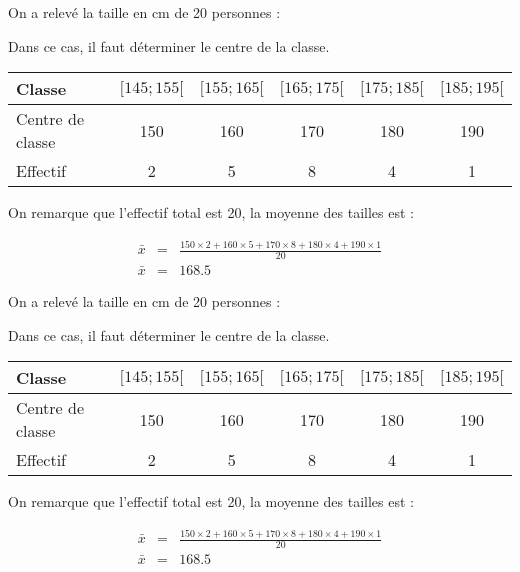 \documentclass[12pt,a4paper]{article}
\date{}
\title{}
\begin{document}

%
%
%
%
%
%
%
%
%



\begin{myex}
	On a relevé la taille en cm de 20 personnes :
	
	Dans ce cas, il faut déterminer le centre de la classe.
	
	\begin{tabular}{|@{\ }l@{\ }|@{\ }c@{\ }|@{\ }c@{\ }|@{\ }c@{\ }|@{\ }c@{\ }|@{\ }c@{\ }|}
		\hline
		Classe           & $[145 ; 155[$ & $[155 ; 165[$ & $[165 ; 175[$ & $[175 ; 185[$ & $[185 ; 195[$ \\ \hline
		Centre de classe & 150           & 160           & 170           & 180           & 190           \\ \hline
		Effectif         & 2             & 5             & 8             & 4             & 1            \\ \hline
	\end{tabular}
	
	\vspace*{0.5cm}
	
	On remarque que l'effectif total est 20, la moyenne des tailles est :
	
	\begin{eqnarray*}
		\bar{x} &=& \frac{150 \times 2 + 160 \times 5 + 170 \times 8 + 180 \times 4 + 190 \times 1}{20}\\
		\bar{x} &=& \num{168.5}
	\end{eqnarray*}
\end{myex}

\begin{myex}
	On a relevé la taille en cm de 20 personnes :
	
	Dans ce cas, il faut déterminer le centre de la classe.
	
	\begin{tabular}{|@{\ }l@{\ }|@{\ }c@{\ }|@{\ }c@{\ }|@{\ }c@{\ }|@{\ }c@{\ }|@{\ }c@{\ }|}
		\hline
		Classe           & $[145 ; 155[$ & $[155 ; 165[$ & $[165 ; 175[$ & $[175 ; 185[$ & $[185 ; 195[$ \\ \hline
		Centre de classe & 150           & 160           & 170           & 180           & 190           \\ \hline
		Effectif         & 2             & 5             & 8             & 4             & 1            \\ \hline
	\end{tabular}
	
	\vspace*{0.5cm}
	
	On remarque que l'effectif total est 20, la moyenne des tailles est :
	
	\begin{eqnarray*}
		\bar{x} &=& \frac{150 \times 2 + 160 \times 5 + 170 \times 8 + 180 \times 4 + 190 \times 1}{20}\\
		\bar{x} &=& \num{168.5}
	\end{eqnarray*}
\end{myex}
\newpage
\end{document}
